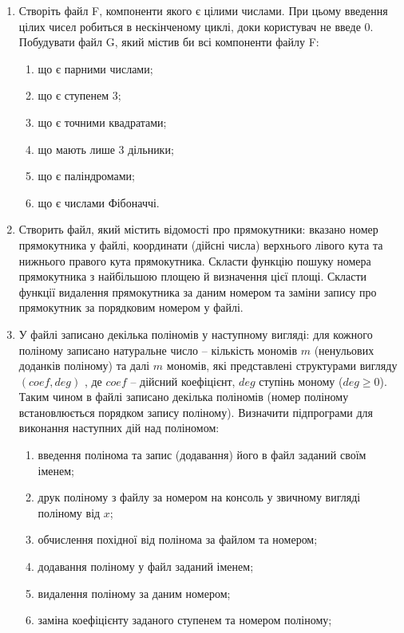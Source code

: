 \documentclass[a5paper,titlepage,openany,twoside,
]
{book_unv}%
\makeatletter
\newcommand{\xslalph}[1]{\expandafter\@xslalph\csname c@#1\endcsname}
\newcommand{\@xslalph}[1]{%
    \ifcase#1\or а\or б\or в\or г\or д\or e\or є\or ж\or з\or i%
    \or й\or к\or л\or м\or н\or о\or п\or р\or с\or т%
    \or у\or ф\or х\or ц\or ч\or ш\or ю\or я\or аа\or бб\or вв%
    \else\@ctrerr\fi%
}
\makeatother
\begin{document}
\begin{enumerate}
\begin{enumerate}
\item
  Створіть файл F, компоненти якого є цілими числами. При цьому введення
цілих чисел робиться в нескінченому циклі, доки користувач не введе 0. 
 Побудувати файл G, який містив би всі компоненти файлу F:
\begin{enumerate}[label=\xslalph*)]
\item
що є парними числами; 
\item
 що є ступенем 3;
\item
що є точними квадратами; 
\item
що мають лише 3 дільники; 
\item
що є паліндромами;
\item
що є числами Фібоначчі.
\end{enumerate}


\item
  Створить файл, який містить відомості про прямокутники: вказано номер
  прямокутника у файлі, координати (дійсні числа) верхнього лівого кута та
  нижнього правого кута прямокутника. Скласти функцію пошуку номера
  прямокутника з найбільшою площею й визначення цієї площі.
  Скласти функції видалення прямокутника за даним номером та 
заміни запису про прямокутник за порядковим номером у файлі.

\item
  У файлі записано декілька поліномів у наступному вигляді:
для кожного поліному записано натуральне число -- кількість
мономів $m$ (ненульових доданків поліному) та далі $m$ мономів, які
представлені структурами вигляду $(coef, deg)$ , де $coef$ -- дійсний коефіцієнт,
$deg$ ступінь моному ($deg \ge 0$). 
Таким чином в файлі записано декілька поліномів (номер поліному встановлюється
порядком запису поліному).
Визначити підпрограми для виконання наступних дій над поліномом:

\begin{enumerate}[label=\xslalph*)]
\item
введення полінома та запис (додавання) його в файл заданий своїм іменем; 
\item
друк поліному з файлу за номером на консоль у звичному вигляді поліному від $x$;
\item
обчислення похідної від полінома за файлом та номером;
\item
додавання поліному у файл заданий іменем;
\item
видалення поліному за даним номером;
\item
заміна коефіцієнту заданого ступенем та номером поліному;


\end{enumerate}
\end{enumerate}
\end{enumerate}
\end{document}
